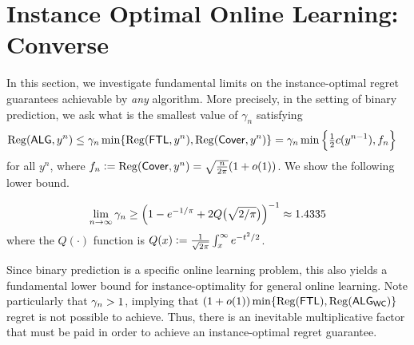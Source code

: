 \section{Instance Optimal Online Learning: Converse} \label{sec:converse} 
In this section, we investigate fundamental limits on the instance-optimal regret guarantees achievable by \emph{any} algorithm. More precisely, in the setting of binary prediction, we ask what is the smallest value of $\gamma_n$ satisfying
\begin{align} \label{eq:LBQues}
    \mathrm{Reg}(\mathsf{ALG}, y^n) &\le \gamma_n \min\{\mathrm{Reg}(\mathsf{FTL},y^n),\mathrm{Reg}(\mathsf{Cover},y^n)\}
    = \gamma_n \min\left\{\tfrac12 c(y^{n-1}), f_n\right\}
\end{align}
for all $y^n$, where $f_n \mathrel{\mathop{:}}=  \mathrm{Reg}(\mathsf{Cover},y^n) = \sqrt{\frac{n}{2 \pi}} (1+o(1))$. 
We show the following lower bound.
\begin{theorem} \label{thm:LowerBdCR}
    \[
    \lim_{n \to \infty} \gamma_n \ge \Big(1-e^{-1/\pi}+2Q\big(\sqrt{2/\pi}\big)\Big)^{-1} \approx 1.4335
    \]
    where the $Q(\cdot)$ function is $Q(x) \mathrel{\mathop{:}}= \frac{1}{\sqrt{2\pi}}\int_{x}^{\infty} e^{-t^2/2}$. 
\end{theorem}
Since binary prediction is a specific online learning problem, this also yields a fundamental lower bound for instance-optimality for general online learning.
Note particularly that $\gamma_n > 1$, implying that $(1+o(1))\min\{\mathrm{Reg}(\mathsf{FTL}),\mathrm{Reg}(\mathsf{ALG}_{\mathsf{WC}})\}$ regret is not possible to achieve. Thus, there is an inevitable multiplicative factor that must be paid in order to achieve an instance-optimal regret guarantee.

